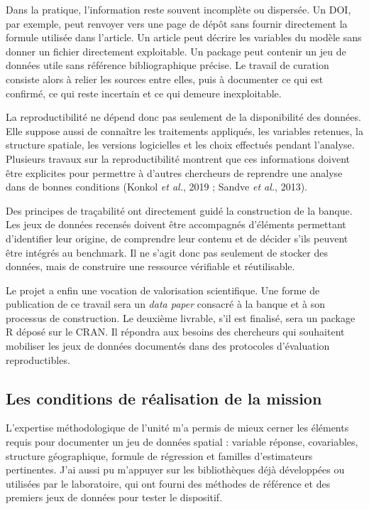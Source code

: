 \documentclass[11pt,a4paper]{article}
\begin{document}
Dans la pratique, l'information reste souvent incomplète ou dispersée. Un DOI, par exemple, peut renvoyer vers une page de dépôt sans fournir directement la formule utilisée dans l'article. Un article peut décrire les variables du modèle sans donner un fichier directement exploitable. Un package peut contenir un jeu de données utile sans référence bibliographique précise. Le travail de curation consiste alors à relier les sources entre elles, puis à documenter ce qui est confirmé, ce qui reste incertain et ce qui demeure inexploitable.

La reproductibilité ne dépend donc pas seulement de la disponibilité des données. Elle suppose aussi de connaître les traitements appliqués, les variables retenues, la structure spatiale, les versions logicielles et les choix effectués pendant l'analyse. Plusieurs travaux sur la reproductibilité montrent que ces informations doivent être explicites pour permettre à d'autres chercheurs de reprendre une analyse dans de bonnes conditions (Konkol \textit{et al.}, 2019 ; Sandve \textit{et al.}, 2013).

Des principes de traçabilité ont directement guidé la construction de la banque. Les jeux de données recensés doivent être accompagnés d'éléments permettant d'identifier leur origine, de comprendre leur contenu et de décider s'ils peuvent être intégrés au benchmark. Il ne s'agit donc pas seulement de stocker des données, mais de construire une ressource vérifiable et réutilisable.

Le projet a enfin une vocation de valorisation scientifique. Une forme de publication de ce travail sera un \textit{data paper} consacré à la banque et à son processus de construction. Le deuxième livrable, s'il est finalisé, sera un package R déposé sur le CRAN. Il répondra aux besoins des chercheurs qui souhaitent mobiliser les jeux de données documentés dans des protocoles d'évaluation reproductibles.


\subsection{Les conditions de réalisation de la mission}

L'expertise méthodologique de l'unité m'a permis de mieux cerner les éléments requis pour documenter un jeu de données spatial : variable réponse, covariables, structure géographique, formule de régression et familles d'estimateurs pertinentes. J'ai aussi pu m'appuyer sur les bibliothèques déjà développées ou utilisées par le laboratoire, qui ont fourni des méthodes de référence et des premiers jeux de données pour tester le dispositif.
\end{document}
